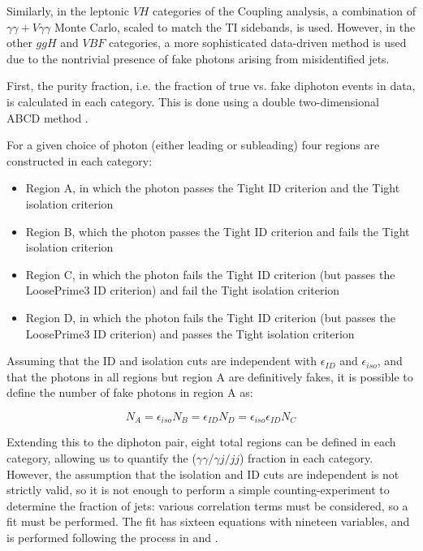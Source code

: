 Similarly, in the leptonic $VH$ categories of the Coupling analysis, a combination of $\gamma\gamma + V\gamma\gamma$ Monte Carlo, scaled to match the TI sidebands, is used. However, in the other $ggH$ and $VBF$ categories, a more sophisticated data-driven method is used due to the nontrivial presence of fake photons arising from misidentified jets. 

First, the purity fraction, i.e. the fraction of true vs. fake diphoton events in data, is calculated in each category. This is done using a double two-dimensional ABCD method \cite{purity1} \cite{purity2}.

For a given choice of photon (either leading or subleading) four regions are constructed in each category:

\begin{itemize}
\item Region A, in which the photon passes the Tight ID criterion and the Tight isolation criterion
\item Region B, which the photon passes the Tight ID criterion and fails the Tight isolation criterion
\item Region C, in which the photon fails the Tight ID criterion (but passes the LoosePrime3 ID criterion) and fail the Tight isolation criterion
\item Region D, in which the photon fails the Tight ID criterion (but passes the LoosePrime3 ID criterion) and passes the Tight isolation criterion
\end{itemize} 

Assuming that the ID and isolation cuts are independent with $\epsilon_{ID}$ and $\epsilon_{iso}$, and that the photons in all regions but region A are definitively fakes, it is possible to define the number of fake photons in region A as:

\begin{equation}
N_{A} = \epsilon_{iso} N_{B} = \epsilon_{ID} N_{D} = \epsilon_{iso} \epsilon_{ID} N_{C}
\end{equation} 

Extending this to the diphoton pair, eight total regions can be defined in each category, allowing us to quantify the ($\gamma \gamma / \gamma j/jj$) fraction in each category. However, the assumption that the isolation and ID cuts are independent is not strictly valid, so it is not enough to perform a simple counting-experiment to determine the fraction of jets: various correlation terms must be considered, so a fit must be performed. The fit has sixteen equations with nineteen variables, and is performed following the process in \cite{purity1} and \cite{purity2}.

